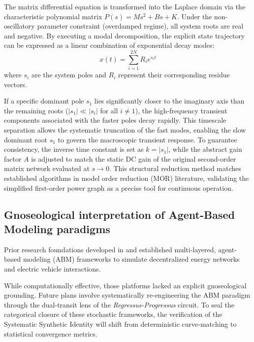 \documentclass[energies,accept,oneauthor,pdftex]{Definitions/mdpi}
\begin{document}
The matrix differential equation is transformed into the Laplace domain via the characteristic polynomial matrix $P(s) = M s^2 + B s + K$. Under the non-oscillatory parameter constraint (overdamped regime), all system roots are real and negative. By executing a modal decomposition, the explicit state trajectory can be expressed as a linear combination of exponential decay modes:
\begin{equation}
    x(t) = \sum_{i=1}^{2N} R_i e^{s_i t}
\end{equation}
where $s_i$ are the system poles and $R_i$ represent their corresponding residue vectors.

If a specific dominant pole $s_1$ lies significantly closer to the imaginary axis than the remaining roots ($|s_1| \ll |s_i|$ for all $i \neq 1$), the high-frequency transient components associated with the faster poles decay rapidly. This timescale separation allows the systematic truncation of the fast modes, enabling the slow dominant root $s_1$ to govern the macroscopic transient response. To guarantee consistency, the inverse time constant is set as $k = |s_1|$, while the abstract gain factor $A$ is adjusted to match the static DC gain of the original second-order matrix network evaluated at $s \to 0$. This structural reduction method matches established algorithms in model order reduction (MOR) literature, validating the simplified first-order power graph as a precise tool for continuous operation.



\subsection{Gnoseological interpretation of Agent-Based Modeling paradigms}

Prior research foundations developed in \cite{durana2014agent} and \cite{durana2015agent} established multi-layered, agent-based modeling (ABM) frameworks to simulate decentralized energy networks and electric vehicle interactions.

While computationally effective, those platforms lacked an explicit gnoseological grounding. Future plans involve systematically re-engineering the ABM paradigm through the dual-transit lens of the \textit{Regressus-Progressus} circuit. To seal the categorical closure of these stochastic frameworks, the verification of the Systematic Synthetic Identity will shift from deterministic curve-matching to statistical convergence metrics.
\end{document}
